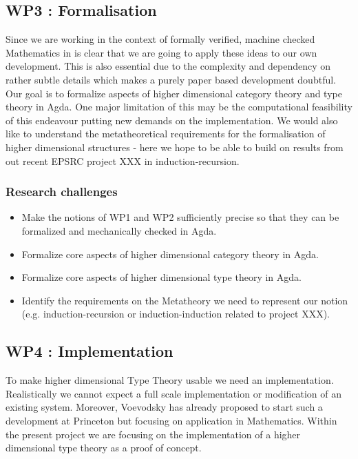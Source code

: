 \documentclass[twocolumn,a4paper]{article}
\begin{document}
\subsection*{WP3 : Formalisation} 
\label{sec:wp:qio}

Since we are working in the context of formally verified, machine
checked Mathematics in is clear that we are going to apply these ideas
to our own development. This is also essential due to the complexity
and dependency on rather subtle details which makes a purely paper
based development doubtful. Our goal is to formalize aspects of higher
dimensional category theory and type theory in Agda. One major
limitation of this may be the computational feasibility of this
endeavour putting new demands on the implementation. We would also
like to understand the metatheoretical requirements for the
formalisation of higher dimensional structures - here we hope to be
able to build on results from out recent EPSRC project XXX in
induction-recursion. 

\subsubsection*{Research challenges}

\begin{itemize}
\item Make the notions of WP1 and WP2 sufficiently precise so that they
  can be formalized and mechanically checked in Agda.

\item Formalize core aspects of higher dimensional category theory in
  Agda.

\item Formalize core aspects of higher dimensional type theory in Agda.

\item Identify the requirements on the Metatheory we need to represent
  our notion (e.g. induction-recursion or induction-induction related
  to project XXX).

\end{itemize}

\subsection*{WP4 : Implementation} 

To make higher dimensional Type Theory usable we need an
implementation. Realistically we cannot expect a full scale
implementation or modification of an existing system. Moreover,
Voevodsky has already proposed to start such a development at
Princeton but focusing on application in Mathematics. Within the
present project we are focusing on the implementation of a higher
dimensional type theory as a proof of concept. 
\end{document}
